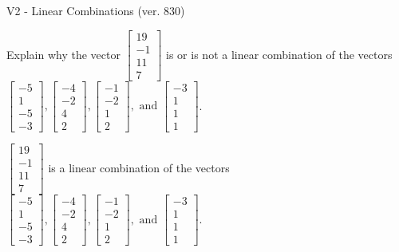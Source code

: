 \begin{exercise}
  \begin{exerciseTitle}V2 - Linear Combinations (ver. 830)\end{exerciseTitle}
  \begin{exerciseStatement}
    Explain why the vector \(\left[\begin{array}{c}
19 \\
-1 \\
11 \\
7
\end{array}\right]\)  is or is not a linear 
	combination of the vectors \(\left[\begin{array}{c}
-5 \\
1 \\
-5 \\
-3
\end{array}\right] , \left[\begin{array}{c}
-4 \\
-2 \\
4 \\
2
\end{array}\right] , \left[\begin{array}{c}
-1 \\
-2 \\
1 \\
2
\end{array}\right] , \text{ and } \left[\begin{array}{c}
-3 \\
1 \\
1 \\
1
\end{array}\right]\).
	


  \end{exerciseStatement}
  \begin{exerciseAnswer}
   \(\left[\begin{array}{c}
19 \\
-1 \\
11 \\
7
\end{array}\right]\) 
  	 is  
	a linear combination of the vectors \(\left[\begin{array}{c}
-5 \\
1 \\
-5 \\
-3
\end{array}\right] , \left[\begin{array}{c}
-4 \\
-2 \\
4 \\
2
\end{array}\right] , \left[\begin{array}{c}
-1 \\
-2 \\
1 \\
2
\end{array}\right] , \text{ and } \left[\begin{array}{c}
-3 \\
1 \\
1 \\
1
\end{array}\right]\).


\end{exerciseAnswer}
\end{exercise}
